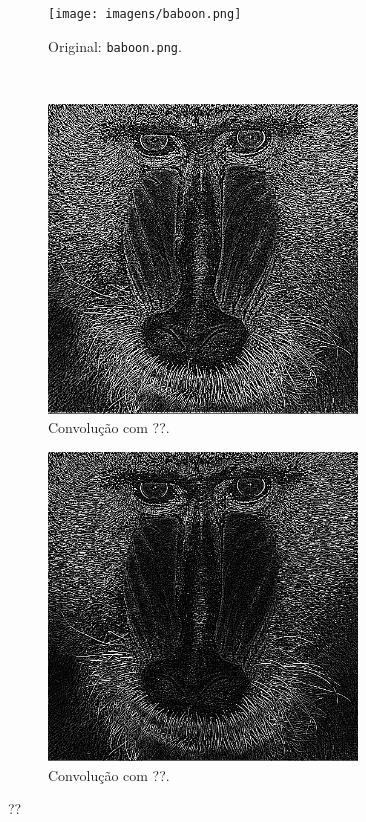 \begin{figure}[H]
    \centering
    \begin{subfigure}{0.48\textwidth}
        \centering
        \texttt{[image: imagens/baboon.png]}
        \caption{Original: \texttt{baboon.png}.}
    \end{subfigure}\\[8pt]
    \begin{subfigure}{0.48\textwidth}
        \centering
        \includegraphics[width=0.9\textwidth]{resultados/baboon_h1.png}
        \caption{Convolução com ??.}
    \end{subfigure}%
    \begin{subfigure}{0.48\textwidth}
        \centering
        \includegraphics[width=0.9\textwidth]{resultados/baboon_h5.png}
        \caption{Convolução com ??.}
    \end{subfigure}

    \caption{??}
\end{figure}
